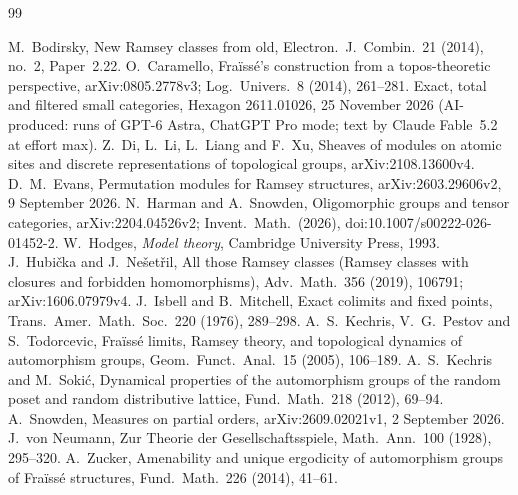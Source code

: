 \documentclass[11pt,a4paper]{article}
\theoremstyle{definition}
\begin{document}
\begin{thebibliography}{99}
\raggedright
{} M.~Bodirsky, New Ramsey classes from old, Electron.\ J.\
 Combin.\ 21 (2014), no.~2, Paper~2.22.
 O.~Caramello, Fra\"iss\'e's construction from a topos-theoretic
 perspective, arXiv:0805.2778v3; Log.\ Univers.\ 8 (2014), 261--281.
\bibitem{D1} Exact, total and filtered small categories, Hexagon
 2611.01026, 25 November 2026 (AI-produced: runs of GPT-6 Astra, ChatGPT
 Pro mode; text by Claude Fable~5.2 at effort max).
 Z.~Di, L.~Li, L.~Liang and F.~Xu, Sheaves of modules on
 atomic sites and discrete representations of topological groups,
 arXiv:2108.13600v4.
 D.~M.~Evans, Permutation modules for Ramsey structures,
 arXiv:2603.29606v2, 9 September 2026.
 N.~Harman and A.~Snowden, Oligomorphic groups and tensor
 categories, arXiv:2204.04526v2; Invent.\ Math.\ (2026),
 doi:10.1007/s00222-026-01452-2.
 W.~Hodges, \emph{Model theory}, Cambridge University Press,
 1993.
 J.~Hubi\v cka and J.~Ne\v set\v ril, All those Ramsey classes
 (Ramsey classes with closures and forbidden homomorphisms), Adv.\ Math.\
 356 (2019), 106791; arXiv:1606.07979v4.
\bibitem{IM} J.~Isbell and B.~Mitchell, Exact colimits and fixed points,
 Trans.\ Amer.\ Math.\ Soc.\ 220 (1976), 289--298.
\bibitem{KPT} A.~S.~Kechris, V.~G.~Pestov and S.~Todorcevic, Fra\"iss\'e
 limits, Ramsey theory, and topological dynamics of automorphism groups,
 Geom.\ Funct.\ Anal.\ 15 (2005), 106--189.
\bibitem{KS} A.~S.~Kechris and M.~Soki\'c, Dynamical properties of the
 automorphism groups of the random poset and random distributive lattice,
 Fund.\ Math.\ 218 (2012), 69--94.
\bibitem{Sn} A.~Snowden, Measures on partial orders, arXiv:2609.02021v1,
 2 September 2026.
\bibitem{vN} J.~von Neumann, Zur Theorie der Gesellschaftsspiele, Math.\
 Ann.\ 100 (1928), 295--320.
\bibitem{Zu} A.~Zucker, Amenability and unique ergodicity of automorphism
 groups of Fra\"iss\'e structures, Fund.\ Math.\ 226 (2014), 41--61.
\end{thebibliography}
\end{document}
